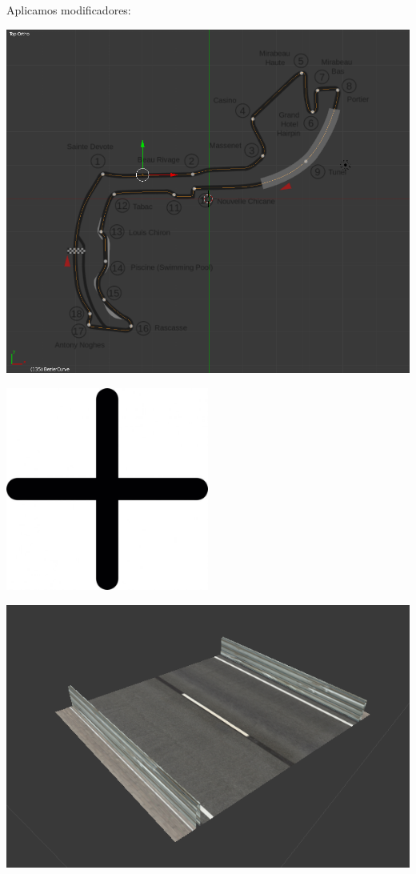 \documentclass[notes,slidesec,a4]{seminar}
\begin{document}
\begin{hslide}
	\begin{center}
		Aplicamos modificadores:
	\end{center}
	\begin{minipage}{0.45\textwidth}
		\includegraphics[width=\textwidth]{MonacoTrazado.png}
	\end{minipage}
	\begin{minipage}{0.1\textwidth}
		\begin{center}
			\includegraphics[width=0.5\textwidth]{mas.jpg}
		\end{center}
	\end{minipage}
	\begin{minipage}{0.45\textwidth}
		\includegraphics[width=\textwidth]{MonacoSegmento.png}

\end{minipage}
\end{hslide}
\end{document}
